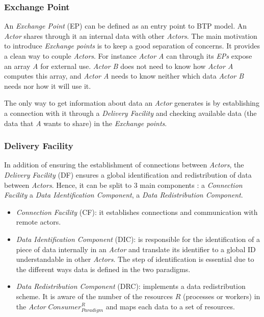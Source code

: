 \subsubsection{Exchange Point}\label{EP}

An \textit{Exchange Point} (EP) can be defined as an entry point to BTP model. An \textit{Actor} shares through it an internal data with other \textit{Actors}. The main motivation to introduce \textit{Exchange points} is to keep a good separation of concerns. It provides a clean way to couple \textit{Actors}. For instance \textit{Actor A} can through its \textit{EPs} expose an array \textit{A} for external use. \textit{Actor B} does not need to know how \textit{Actor A} computes this array, and \textit{Actor A} needs to know neither which data \textit{Actor B} needs nor how it will use it.

The only way to get information about data an \textit{Actor} generates is by establishing a connection with it through a \textit{Delivery Facility} and checking available data (the data that \textit{A} wants to share) in the \textit{Exchange points}.

\subsubsection{Delivery Facility}\label{DF}

In addition of ensuring the establishment of connections between \textit{Actors}, the \textit{Delivery Facility} (DF) ensures a global identification and redistribution of data between \textit{Actors}. Hence,  it can be split to 3 main components : a \textit{Connection Facility} a \textit{Data Identification Component}, a \textit{Data Redistribution Component}.
\begin{itemize}
   \item \textit{Connection Facility} (CF): it establishes connections and communication with remote actors.
   \item \textit{Data Identification Component} (DIC): is responsible for the identification of a piece of data internally in an \textit{Actor} and translate its identifier to a global ID understandable in other \textit{Actors}. The step of identification is essential due to the different ways data is defined in the two paradigms. 
   
   \item \textit{Data Redistribution Component} (DRC): implements a data redistribution scheme. It is aware of the number of the resources $R$ (processes or workers) in the \textit{Actor} $Consumer_{Paradigm}^{R}$ and maps each data to a set of resources.
\end{itemize}

